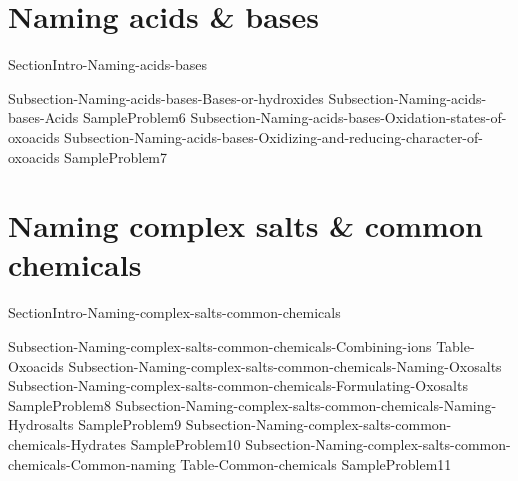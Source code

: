 \documentclass[main.tex]{subfiles}
\newcommand\chapterlabel{Ch-naming}\setcounter{figurenewcounter}{0}\setcounter{tablenewcounter}{0}\setcounter{formulanewcounter}{0}
\begin{document}
\section{Naming acids \& bases}
{SectionIntro-Naming-acids-bases}
\sloppy \begin{description}
{Subsection-Naming-acids-bases-Bases-or-hydroxides}
{Subsection-Naming-acids-bases-Acids}
{SampleProblem6}
{Subsection-Naming-acids-bases-Oxidation-states-of-oxoacids}
{Subsection-Naming-acids-bases-Oxidizing-and-reducing-character-of-oxoacids}
{SampleProblem7}
\end{description}

\section{Naming complex salts  \& common chemicals}
{SectionIntro-Naming-complex-salts-common-chemicals}
\sloppy \begin{description}
{Subsection-Naming-complex-salts-common-chemicals-Combining-ions}
 {Table-Oxoacids}
{Subsection-Naming-complex-salts-common-chemicals-Naming-Oxosalts}
{Subsection-Naming-complex-salts-common-chemicals-Formulating-Oxosalts}
{SampleProblem8}
{Subsection-Naming-complex-salts-common-chemicals-Naming-Hydrosalts}
{SampleProblem9}
{Subsection-Naming-complex-salts-common-chemicals-Hydrates}
{SampleProblem10}
{Subsection-Naming-complex-salts-common-chemicals-Common-naming}
{Table-Common-chemicals}	
 {SampleProblem11}

 
\end{description}










 
\end{document}
